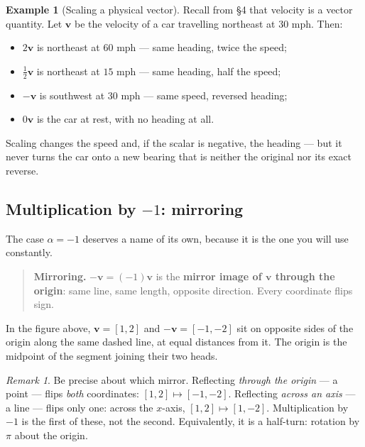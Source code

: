\documentclass[11pt]{article}
\theoremstyle{definition}
\newtheorem{ex}{Example}
\theoremstyle{remark}
\newtheorem*{rmk}{Remark}
\newcommand{\vc}[1]{\mathbf{#1}}
\begin{document}
\begin{ex}[Scaling a physical vector]
Recall from \S4 that velocity is a vector quantity. Let $\vc{v}$ be the velocity
of a car travelling northeast at $30$ mph. Then:
\begin{itemize}[leftmargin=1.4em,itemsep=1pt,topsep=3pt]
  \item $2\vc{v}$ is northeast at $60$ mph --- same heading, twice the speed;
  \item $\tfrac12\vc{v}$ is northeast at $15$ mph --- same heading, half the speed;
  \item $-\vc{v}$ is southwest at $30$ mph --- same speed, reversed heading;
  \item $0\vc{v}$ is the car at rest, with no heading at all.
\end{itemize}
Scaling changes the speed and, if the scalar is negative, the heading --- but it
never turns the car onto a new bearing that is neither the original nor its
exact reverse.
\end{ex}

\subsection{Multiplication by $-1$: mirroring}
The case $\alpha=-1$ deserves a name of its own, because it is the one you will
use constantly.

\begin{quote}
\textbf{Mirroring.} $-\vc{v}=(-1)\vc{v}$ is the \textbf{mirror image of
$\vc{v}$ through the origin}: same line, same length, opposite direction. Every
coordinate flips sign.
\end{quote}

\noindent In the figure above, $\vc{v}=[1,2]$ and $-\vc{v}=[-1,-2]$ sit on
opposite sides of the origin along the same dashed line, at equal distances from
it. The origin is the midpoint of the segment joining their two heads.

\begin{rmk}
Be precise about which mirror. Reflecting \emph{through the origin} --- a point
--- flips \emph{both} coordinates: $[1,2]\mapsto[-1,-2]$. Reflecting
\emph{across an axis} --- a line --- flips only one: across the $x$-axis,
$[1,2]\mapsto[1,-2]$. Multiplication by $-1$ is the first of these, not the
second. Equivalently, it is a half-turn: rotation by $\pi$ about the origin.
\end{rmk}
\end{document}
